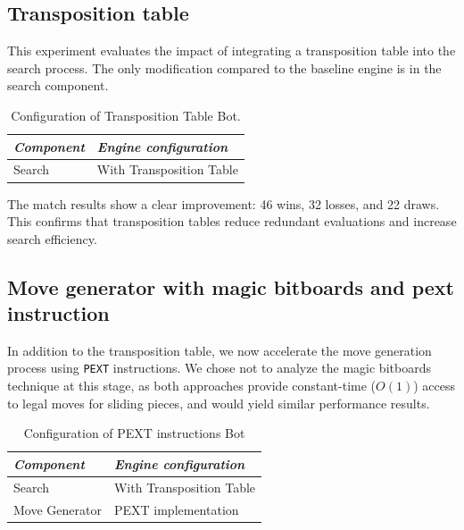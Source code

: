 \subsection*{Transposition table}
\label{sec:tt}

\noindent This experiment evaluates the impact of integrating a transposition table into the search process. The only modification compared to the baseline engine is in the search component.

\vspace{0.5em}

\begin{table}[H]
    \centering
    \begin{tabular}{|p{4cm}|p{6cm}|}
    \hline
    \textit{Component}         & \textit{Engine configuration}            \\ \hline
    Search                     & With Transposition Table \\ \hline
    \end{tabular}
    \caption*{Configuration of Transposition Table Bot.}
    \label{tab:tt_vs_basic}
\end{table}

\begin{center}
\medskip
\end{center}

\noindent The match results show a clear improvement: 46 wins, 32 losses, and 22 draws. This confirms that transposition tables reduce redundant evaluations and increase search efficiency.

\subsection*{Move generator with magic bitboards and pext instruction}

\noindent In addition to the transposition table, we now accelerate the move generation process using \texttt{PEXT}  instructions. We chose not to analyze the magic bitboards technique at this stage, as both approaches provide constant-time (\( O(1) \)) access to legal moves for sliding pieces, and would yield similar performance results.

\vspace{1em}

\begin{table}[H]
    \centering
    \begin{tabular}{|p{4cm}|p{6cm}|}
    \hline
    \textit{Component}         & \textit{Engine configuration}    \\ \hline
    Search                     & With Transposition Table                     \\ \hline
    Move Generator             & PEXT implementation                \\ \hline
    \end{tabular}
    \caption*{Configuration of PEXT instructions Bot}\label{tab:pext_vs_basic}
\end{table}

